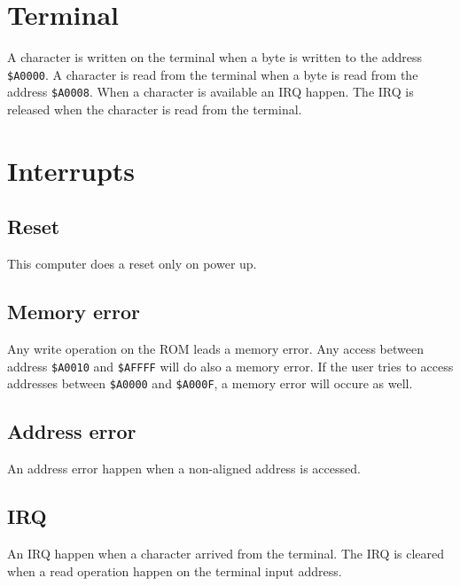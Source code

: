 \documentclass[11pt]{article}
\begin{document}
\section{Terminal}

A character is written on the terminal when a byte is written to the address
\texttt{\$A0000}. \newline
A character is read from the terminal when a byte is read from the
address \texttt{\$A0008}. \newline
When a character is available an IRQ happen. The IRQ is released when the
character is read from the terminal.

\section{Interrupts}
\subsection{Reset}
This computer does a reset only on power up.
\subsection{Memory error}
Any write operation on the ROM leads a memory error. Any access between address
\texttt{\$A0010} and \texttt{\$AFFFF} will do also a memory error. If the user tries to access
addresses between \texttt{\$A0000} and \texttt{\$A000F}, a memory error will occure as well.
\subsection{Address error}
An address error happen when a non-aligned address is accessed.
\subsection{IRQ}
An IRQ happen when a character arrived from the terminal. The IRQ is cleared
when a read operation happen on the terminal input address.
\end{document}
